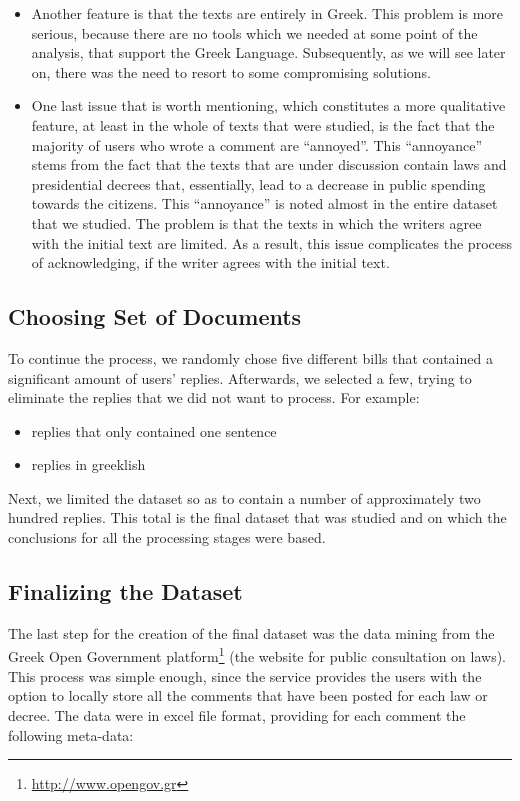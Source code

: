 \begin{itemize}
  \item Another feature is that the texts are entirely in Greek. This problem is more 	serious, because there are no tools which we needed at some point of the analysis, that support the Greek Language. Subsequently, as we will see later on, there was the need to resort to some compromising solutions.\\
  
  \item One last issue that is worth mentioning, which constitutes a more qualitative feature, at least in the whole of texts that were studied, is the fact that the majority of users who wrote a comment are ``annoyed''. This ``annoyance'' stems from the fact that the texts that are under discussion contain laws and presidential decrees that, essentially, lead to a decrease in public spending towards the citizens. This ``annoyance'' is noted almost in the entire dataset that we studied. The problem is that the texts in which the writers agree with the initial text are limited. As a result, this issue complicates the process of acknowledging, if the writer agrees with the initial text.
\end{itemize}


\subsection{Choosing Set of Documents}\label{312_ref}
To continue the process, we randomly chose five different bills that contained a significant amount of users' replies. Afterwards, we selected a few, trying to eliminate the replies that we did not want to process. For example:\\

\begin{itemize}

	\item replies that only contained one sentence
	\item replies in greeklish\\

\end{itemize}

Next, we limited the dataset so as to contain a number of approximately two hundred replies. This total is the final dataset that was studied and on which the conclusions for all the processing stages were based.

\subsection{Finalizing the Dataset}\label{313_ref}
The last step for the creation of the final dataset was the data mining from the Greek Open Government platform\footnote{\url{http://www.opengov.gr}} (the website for public consultation on laws). This process was  simple enough, since the service provides the users with the option to locally store all the comments that have been posted for each law or decree. The data were in excel file format, providing for each comment the following meta-data:\\

